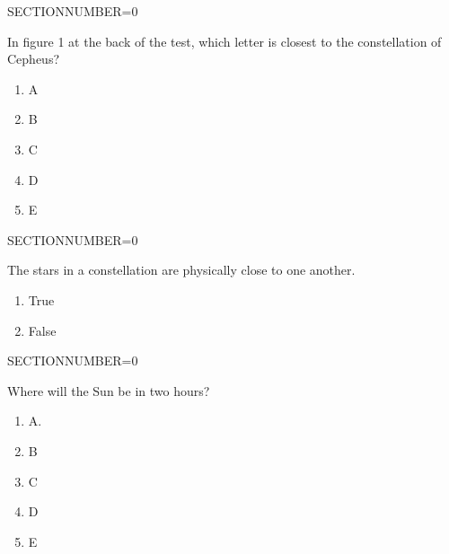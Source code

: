 \documentclass[11pt]{article}
\begin{document}
\begin{enumerate}
\begin{minipage}{\textwidth}
\begin{minipage}{\textwidth}
\end{minipage}
SECTIONNUMBER=0
\end{minipage}
\vskip 0.20in

\begin{minipage}{\textwidth}
\begin{minipage}{\textwidth}
\item In figure 1 at the back of the test, which letter is closest to the constellation of Cepheus?
\begin{multicols}{3}
\begin{enumerate} 
\setlength{\itemsep}{1pt} 
\setlength{\parskip}{0pt} 
\setlength{\parsep}{0pt}
\setlength{\multicolsep}{1pt} 
\item A
\item B
\item C
\item D
\item E
\end{enumerate} 
\vfill 
\end{multicols}

\end{minipage}
SECTIONNUMBER=0
\end{minipage}
\vskip 0.20in

\begin{minipage}{\textwidth}
\begin{minipage}{\textwidth}
\item The stars in a constellation are physically close to one another.
\begin{multicols}{3}
\begin{enumerate} 
\setlength{\itemsep}{1pt} 
\setlength{\parskip}{0pt} 
\setlength{\parsep}{0pt}
\setlength{\multicolsep}{1pt} 
\item True
\item False
\end{enumerate} 
\vfill 
\end{multicols}

\end{minipage}
SECTIONNUMBER=0
\end{minipage}
\vskip 0.20in

\begin{minipage}{\textwidth}
\begin{minipage}{\textwidth}
\item Where will the Sun be in two hours?
\begin{multicols}{3}
\begin{enumerate} 
\setlength{\itemsep}{1pt} 
\setlength{\parskip}{0pt} 
\setlength{\parsep}{0pt}
\setlength{\multicolsep}{1pt} 
\item A.
\item B
\item C
\item D
\item E
\end{enumerate} 
\vfill 
\end{multicols}


\end{minipage}
\end{minipage}
\end{enumerate}
\end{document}
